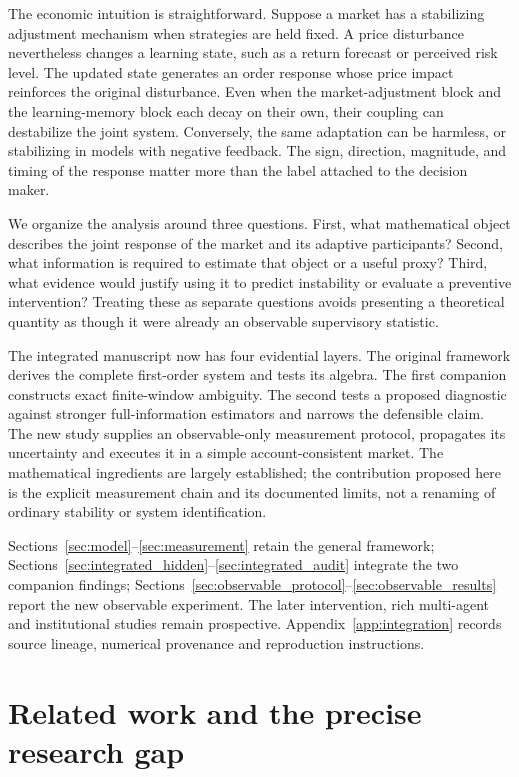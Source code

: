 \documentclass[11pt,a4paper]{article}
\theoremstyle{definition}
\theoremstyle{remark}
\begin{document}
The economic intuition is straightforward. Suppose a market has a stabilizing adjustment mechanism when strategies are held fixed. A price disturbance nevertheless changes a learning state, such as a return forecast or perceived risk level. The updated state generates an order response whose price impact reinforces the original disturbance. Even when the market-adjustment block and the learning-memory block each decay on their own, their coupling can destabilize the joint system. Conversely, the same adaptation can be harmless, or stabilizing in models with negative feedback. The sign, direction, magnitude, and timing of the response matter more than the label attached to the decision maker.

We organize the analysis around three questions. First, what mathematical object describes the joint response of the market and its adaptive participants? Second, what information is required to estimate that object or a useful proxy? Third, what evidence would justify using it to predict instability or evaluate a preventive intervention? Treating these as separate questions avoids presenting a theoretical quantity as though it were already an observable supervisory statistic.

The integrated manuscript now has four evidential layers. The original framework derives the complete first-order system and tests its algebra. The first companion constructs exact finite-window ambiguity. The second tests a proposed diagnostic against stronger full-information estimators and narrows the defensible claim. The new study supplies an observable-only measurement protocol, propagates its uncertainty and executes it in a simple account-consistent market. The mathematical ingredients are largely established; the contribution proposed here is the explicit measurement chain and its documented limits, not a renaming of ordinary stability or system identification.

Sections~\ref{sec:model}--\ref{sec:measurement} retain the general framework; Sections~\ref{sec:integrated_hidden}--\ref{sec:integrated_audit} integrate the two companion findings; Sections~\ref{sec:observable_protocol}--\ref{sec:observable_results} report the new observable experiment. The later intervention, rich multi-agent and institutional studies remain prospective. Appendix~\ref{app:integration} records source lineage, numerical provenance and reproduction instructions.

\section{Related work and the precise research gap}
\label{sec:related}
\end{document}
